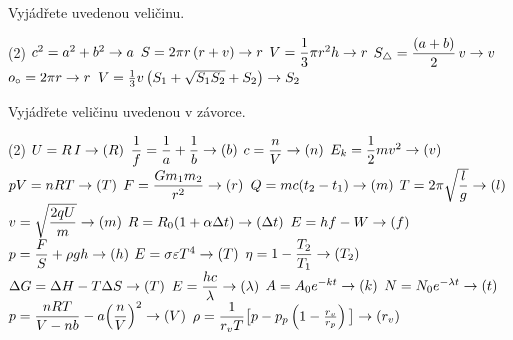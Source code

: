 \documentclass[12pt,a4paper]{article}
\begin{document}
\newpage
\setcounter{section}{4}
\begin{exercise}
    Vyjádřete uvedenou veličinu.
    \begin{tasks}(2)
        \task $c^2 = a^2 + b^2 \hfill \rightarrow a$
        \task $S = 2\pi r\,(r+v) \hfill \rightarrow r$
        \task $V = \dfrac{1}{3}\pi r^2 h \hfill \rightarrow r$
        \task $S_{\triangle} = \dfrac{(a+b)}{2}\,v \hfill \rightarrow v$
        \task $o_{\circ} = 2\pi r \hfill \rightarrow r$
        \task $V=\frac{1}{3}v\left(S_1 + \sqrt{S_1S_2} + S_2\right)\hfill \rightarrow S_2$
    \end{tasks}
\end{exercise}


\begin{exercise}
    Vyjádřete veličinu uvedenou v závorce.
    \begin{tasks}(2)
        \task $U = R\,I \hfill \rightarrow (R)$
        \task $\dfrac{1}{f} = \dfrac{1}{a} + \dfrac{1}{b} \hfill \rightarrow (b)$
        \task $c = \dfrac{n}{V} \hfill \rightarrow (n)$
        \task $E_k = \dfrac{1}{2} m v^2 \hfill \rightarrow (v)$
        \task $pV = nRT \hfill \rightarrow (T)$
        \task $F = \dfrac{G m_1 m_2}{r^2} \hfill \rightarrow (r)$
        \task $Q = m c (t_2 - t_1) \hfill \rightarrow (m)$
        \task $T = 2\pi \sqrt{\dfrac{l}{g}} \hfill \rightarrow (l)$
        \task $v = \sqrt{\dfrac{2qU}{m}} \hfill \rightarrow (m)$
        \task $R = R_0(1 + \alpha \Delta t) \hfill \rightarrow (\Delta t)$
        \task $E = h f - W \hfill \rightarrow (f)$
        \task $p = \dfrac{F}{S} + \rho g h \hfill \rightarrow (h)$
        \task $E = \sigma \varepsilon T^4 \hfill \rightarrow (T)$
        \task $\eta = 1 - \dfrac{T_2}{T_1} \hfill \rightarrow (T_2)$
        \task $\Delta G = \Delta H - T\Delta S \hfill \rightarrow (T)$
        \task $E = \dfrac{hc}{\lambda} \hfill \rightarrow (\lambda)$
        \task $A = A_0 e^{-k t} \hfill \rightarrow (k)$
        \task $N = N_0 e^{-\lambda t} \hfill \rightarrow (t)$
        \task $p = \dfrac{nRT}{V - nb} - a\!\left(\dfrac{n}{V}\right)^2 \hfill \rightarrow (V)$
        \task $\rho = \dfrac{1}{r_vT}\big[p-p_p\left(1-\frac{r_v}{r_p}\right)\big] \hfill \rightarrow (r_v)$
    \end{tasks}
\end{exercise}
\end{document}
